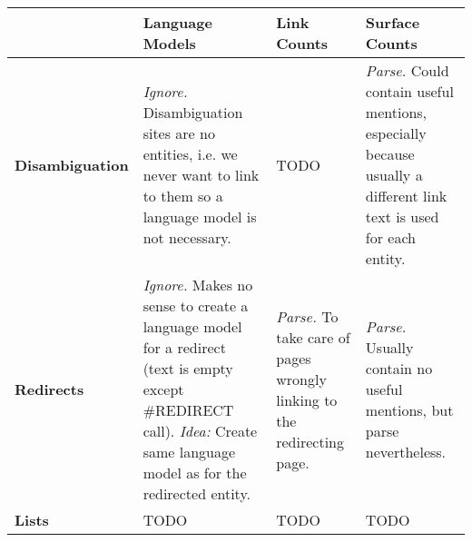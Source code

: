 \documentclass[a4paper, landscape]{article}
\begin{document}
\begin{longtable}{p{3cm}p{5cm}p{5cm}p{5cm}}
	\toprule
	& \textbf{Language Models} & \textbf{Link Counts} & \textbf{Surface Counts} \\

	\midrule
	\textbf{Disambiguation}
		& \emph{Ignore.} Disambiguation sites are no entities, i.e. we never want to link to them so a language model is not necessary.
		& TODO
		& \emph{Parse.} Could contain useful mentions, especially because usually a different link text is used for each entity.  \\
	\textbf{Redirects}
		& \emph{Ignore.} Makes no sense to create a language model for a redirect (text is empty except \mbox{\#REDIRECT} call). \emph{Idea:} Create same language model as for the redirected entity.
		& \emph{Parse.} To take care of pages wrongly linking to the redirecting page.
		& \emph{Parse.} Usually contain no useful mentions, but parse nevertheless. \\
	\textbf{Lists}
		& TODO
		& TODO
		& TODO

	\\\bottomrule
\end{longtable}
\end{document}
